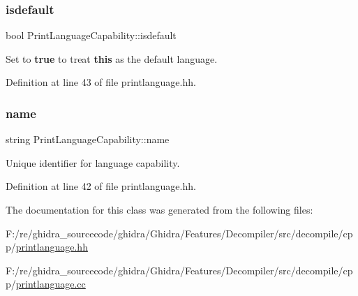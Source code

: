 \subsubsection{\texorpdfstring{isdefault}{isdefault}}
{\footnotesize\ttfamily bool Print\+Language\+Capability\+::isdefault\hspace{0.3cm}{\ttfamily [protected]}}



Set to {\bfseries{true}} to treat {\bfseries{this}} as the default language. 



Definition at line 43 of file printlanguage.\+hh.

\mbox{\label{class_print_language_capability_ac286f0481d6c9ebfcf2cd497cc786e8b}} 
\subsubsection{\texorpdfstring{name}{name}}
{\footnotesize\ttfamily string Print\+Language\+Capability\+::name\hspace{0.3cm}{\ttfamily [protected]}}



Unique identifier for language capability. 



Definition at line 42 of file printlanguage.\+hh.



The documentation for this class was generated from the following files\+:\begin{DoxyCompactItemize}
\item 
F\+:/re/ghidra\+\_\+sourcecode/ghidra/\+Ghidra/\+Features/\+Decompiler/src/decompile/cpp/\mbox{\hyperlink{printlanguage_8hh}{printlanguage.\+hh}}\item 
F\+:/re/ghidra\+\_\+sourcecode/ghidra/\+Ghidra/\+Features/\+Decompiler/src/decompile/cpp/\mbox{\hyperlink{printlanguage_8cc}{printlanguage.\+cc}}\end{DoxyCompactItemize}
